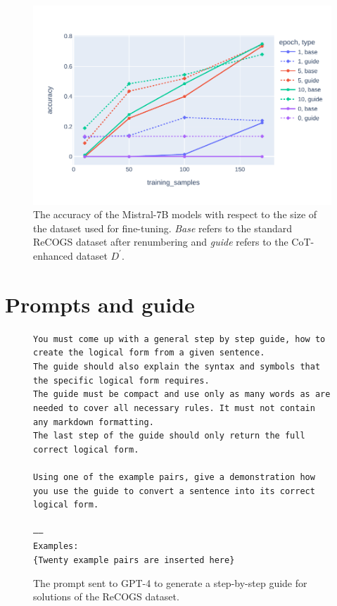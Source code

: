 \documentclass[11pt]{article}
\begin{document}
    \begin{figure}
        \centering
        \includegraphics[width=\columnwidth]{../plots/accuracy_vs_data.pdf}
        \caption{The accuracy of the Mistral-7B models with respect to the size of the dataset used for fine-tuning.
        \emph{Base} refers to the standard ReCOGS dataset after renumbering and \emph{guide}
        refers to the CoT-enhanced dataset $D^\prime$.
        }
        \label{fig:acc_vs_data}
    \end{figure}

    

    \appendix


    \section{Prompts and guide}\label{sec:appendix}

    \begin{figure}
        \small
        \texttt{You must come up with a general step by step guide, how to create the logical form from a given sentence.\\
        The guide should also explain the syntax and symbols that the specific logical form requires.\\
        The guide must be compact and use only as many words as are needed to cover all necessary rules. It must not contain any markdown formatting.\\
        The last step of the guide should only return the full correct logical form.\\
        \\
        Using one of the example pairs, give a demonstration how you use the guide to convert a sentence into its correct logical form.\\
        \\
        -----\\
        Examples:\\
        {\color{red}\{Twenty example pairs are inserted here\}}
        }
        \caption{The prompt sent to GPT-4 to generate a step-by-step guide for solutions of the ReCOGS dataset.}
        \label{fig:guide_prompt}
    \end{figure}
\end{document}
